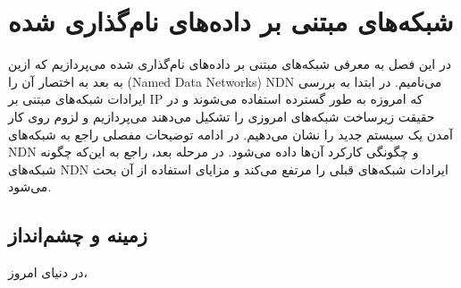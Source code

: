 

\chapter{ شبکه‌های مبتنی بر داده‌های نام‌گذاری شده}
در این فصل به معرفی شبکه‌های مبتنی بر داده‌های نام‌گذاری شده می‌پردازیم که ازین به بعد به اختصار آن را (Named Data Networks) NDN می‌نامیم.  در ابتدا به بررسی ایرادات شبکه‌های مبتنی بر IP که امروزه به طور گسترده استفاده می‌شوند و در حقیقت زیرساخت شبکه‌های امروزی را تشکیل می‌دهند می‌پردازیم و لزوم روی کار آمدن یک سیستم جدید را نشان می‌دهیم. در ادامه توضیحات مفصلی راجع به شبکه‌های NDN و چگونگی کارکرد آن‌ها داده می‌شود. در مرحله بعد، راجع به این‌که چگونه شبکه‌های NDN ایرادات شبکه‌های قبلی را مرتفع می‌کند و مزایای استفاده از آن بحث می‌شود. 

\section{زمینه و چشم‌انداز}
در دنیای امروز، 

